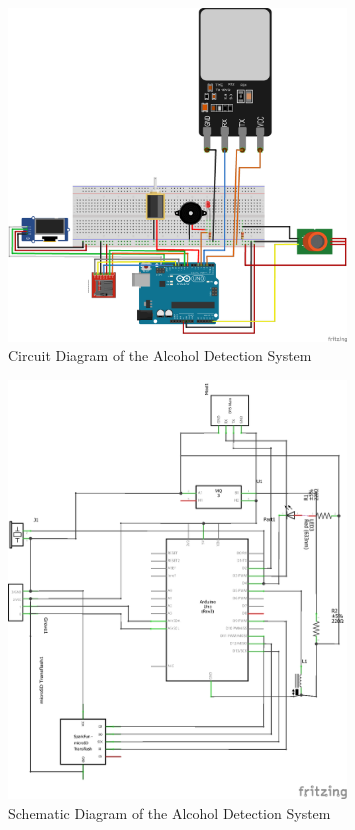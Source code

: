 \begin{figure}[H]
    \centering
    \includegraphics[width=0.8\textwidth]{images/circuit_diagram.png}
    \caption{Circuit Diagram of the Alcohol Detection System}
    \label{fig:circuit_diagram}
\end{figure}
\begin{figure}[H]
    \centering
    \includegraphics[width=0.8\textwidth]{images/schematic.png}
    \caption{Schematic Diagram of the Alcohol Detection System}
    \label{fig:circuit_diagram}
\end{figure}

